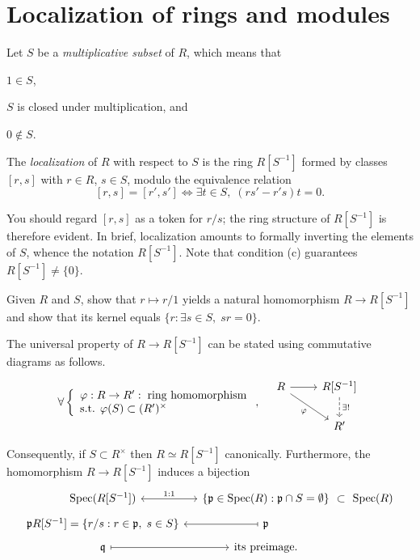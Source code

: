 \section{Localization of rings and modules} 
Let $S$ be a \emph{multiplicative subset} of $R$, which means that
\begin{inparaenum}[(a)]
	\item $1 \in S$,
	\item $S$ is closed under multiplication, and
	\item $0 \notin S$.
\end{inparaenum}
The \emph{localization} of $R$ with respect to $S$ is the ring $R[S^{-1}]$ formed by classes $[r,s]$ with $r \in R$, $s \in S$, modulo the equivalence relation
\[ [r,s] = [r',s'] \iff \exists t \in S, \; (rs' - r's)t = 0. \]

You should regard $[r,s]$ as a token for $r/s$; the ring structure of $R[S^{-1}]$ is therefore evident. In brief, localization amounts to formally inverting the elements of $S$, whence the notation $R[S^{-1}]$. Note that condition (c) guarantees $R[S^{-1}] \neq \{0\}$.

\begin{exercise}
	Given $R$ and $S$, show that $r \mapsto r/1$ yields a natural homomorphism $R \to R[S^{-1}]$ and show that its kernel equals $\{r: \exists s \in S, \; sr=0 \}$.
\end{exercise}

The universal property of $R \to R[S^{-1}]$ can be stated using commutative diagrams as follows.
\[
	\forall \left\{ \begin{array}{l}
		\varphi: R \to R': \; \text{ring homomorphism} \\
		\text{s.t. } \varphi(S) \subset (R')^\times
	\end{array}\right. ,\quad
	\begin{tikzcd}
		R \arrow[r] \arrow[rd, "\varphi"'] & R[S^{-1}] \arrow[d, dashed, "\exists!"] \\
		& R'
	\end{tikzcd}
\]

Consequently, if $S \subset R^\times$ then $R \simeq R[S^{-1}]$ canonically. Furthermore, the homomorphism $R \to R[S^{-1}]$ induces a bijection
\begin{equation}\label{eqn:localization-Spec} \begin{tikzcd}[row sep=tiny, column sep=small]
	\Spec(R[S^{-1}]) \arrow[leftrightarrow, r, "1:1"] & \left\{ \mathfrak{p} \in \Spec(R): \mathfrak{p} \cap S = \emptyset \right\} \arrow[phantom, r, "\subset" description] & \Spec(R) \\
	\mathfrak{p} R[S^{-1}] = \{ r/s: r \in \mathfrak{p}, \; s \in S \} & \mathfrak{p} \arrow[mapsto, l] & \\
	\mathfrak{q} \arrow[mapsto, r] & \text{its preimage} .
\end{tikzcd}\end{equation}

